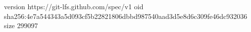 version https://git-lfs.github.com/spec/v1
oid sha256:4e7a544343a5d093cf5b22821806dbbd987540aad3d5e8d6c309fe46dc932036
size 299097
